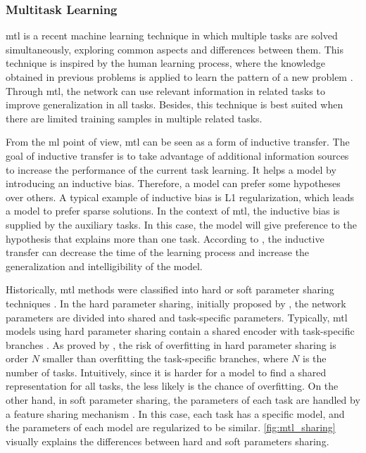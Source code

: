 \subsubsection{Multitask Learning}

\acf{mtl} is a recent machine learning technique in which multiple tasks are solved simultaneously, exploring common aspects and differences between them. This technique is inspired by the human learning process, where the knowledge obtained in previous problems is applied to learn the pattern of a new problem \citep{zhang2017survey}. Through \acs{mtl}, the network can use relevant information in related tasks to improve generalization in all tasks. Besides, this technique is best suited when there are limited training samples in multiple related tasks.

From the \acl{ml} point of view, \acl{mtl} can be seen as a form of inductive transfer. The goal of inductive transfer is to take advantage of additional information sources to increase the performance of the current task learning. It helps a model by introducing an inductive bias. Therefore, a model can prefer some hypotheses over others. A typical example of inductive bias is L1 regularization, which leads a model to prefer sparse solutions. In the context of \acs{mtl}, the inductive bias is supplied by the auxiliary tasks. In this case, the model will give preference to the hypothesis that explains more than one task. According to \cite{Caruana1997}, the inductive transfer can decrease the time of the learning process and increase the generalization and intelligibility of the model. 

Historically, \acs{mtl} methods were classified into hard or soft parameter sharing techniques \citep{vandenhende2021multi}. In the hard parameter sharing, initially proposed by \cite{Caruana1997}, the network parameters are divided into shared and task-specific parameters. Typically, \acs{mtl} models using hard parameter sharing contain a shared encoder with task-specific branches \citep{kendall2018multi, chen2018gradnorm, sener2018multi}. As proved by \cite{baxter1997bayesian}, the risk of overfitting in hard parameter sharing is order $N$ smaller than overfitting the task-specific branches, where $N$ is the number of tasks. Intuitively, since it is harder for a model to find a shared representation for all tasks, the less likely is the chance of overfitting. On the other hand, in soft parameter sharing, the parameters of each task are handled by a feature sharing mechanism \citep{ruder2019latent, gao2019nddr, liu2019end}. In this case, each task has a specific model, and the parameters of each model are regularized to be similar. \autoref{fig:mtl_sharing} visually explains the differences between hard and soft parameters sharing.

